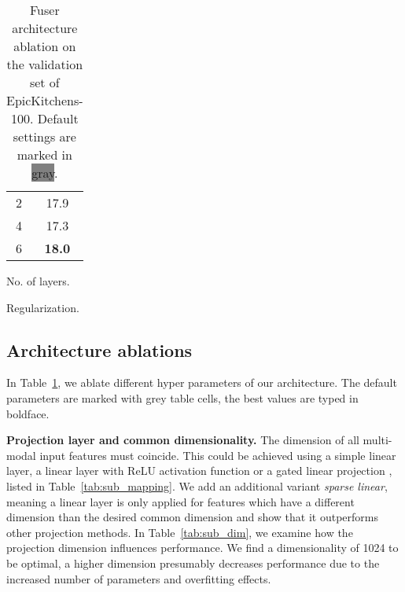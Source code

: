 \documentclass[10pt,twocolumn,letterpaper,dvipsnames]{article}
\begin{document}
\begin{table}[t]
\begin{subtable}[t]{.28\linewidth}
{\begin{tabular}[t]{c|c}
         2 & 17.9 \\
         4 & 17.3\\
         \cellcolor{Gray}6 & \cellcolor{Gray}\textbf{18.0}\\
    \end{tabular}}
    \caption{No. of layers.}
    \label{tab:sub_layers}
    \end{subtable}
    \begin{subtable}[t]{.58\linewidth}
    \caption{Regularization.}
    \label{tab:sub_regularization}
    \end{subtable}
    \caption{Fuser architecture ablation on the validation set of EpicKitchens-100. 
Default settings are marked in \colorbox{Gray}{gray}.}
    \label{tab:fuser_architecture}
\end{table} 
\subsection{Architecture ablations}
\label{sec:ablation:fuserparams}
In Table~\ref{tab:fuser_architecture}, we ablate different hyper parameters of our architecture. The default parameters are marked with grey table cells, the best values are typed in boldface.

\noindent\textbf{Projection layer and common dimensionality.} The dimension of all multi-modal input features must coincide. This could be achieved using a simple linear layer, a linear layer with ReLU activation function \cite{kazakosLittleHelpMy2021,gongFutureTransformerLongterm2022} or a gated linear projection \cite{miechLearnablePoolingContext2017,shvetsovaEverythingOnceMultiModal2022}, listed in Table~\ref{tab:sub_mapping}. We add an additional variant \textit{sparse linear}, meaning a linear layer is only applied for features which have a different dimension than the desired common dimension and show that it outperforms other projection methods. In Table~\ref{tab:sub_dim}, we examine how the projection dimension influences performance. We find a dimensionality of 1024 to be optimal, a higher dimension presumably decreases performance due to the increased number of parameters and overfitting effects.
\end{document}
